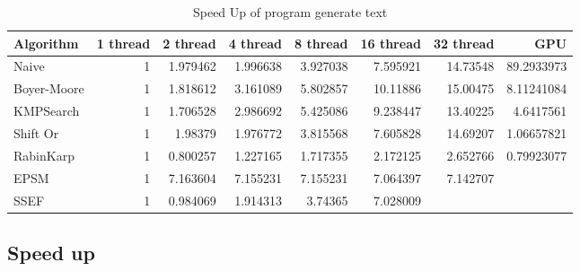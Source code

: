 \documentclass[11pt]{article}       %
\newcommand{\includeFig}[3]      {\begin{figure}[htb] \begin{center}
                                 \includegraphics
                                 [width=4in,keepaspectratio] %
                                 {#2}\caption{\label{#1}#3} \end{center} \end{figure}}
\begin{document}
\begin{table}[htbp]
  \centering
  \caption{Speed Up of program generate text}
    \begin{tabular}{lrrrrrrr}\label{t9}
Algorithm & 1 thread & 2 thread & 4 thread & 8 thread & 16 thread & 32 thread & GPU \\
 \hline
    Naive & 1     & 1.979462 & 1.996638 & 3.927038 & 7.595921 & 14.73548 & 89.2933973 \\
    Boyer-Moore & 1     & 1.818612 & 3.161089 & 5.802857 & 10.11886 & 15.00475 & 8.11241084 \\
    KMPSearch & 1     & 1.706528 & 2.986692 & 5.425086 & 9.238447 & 13.40225 & 4.6417561 \\
    Shift Or & 1     & 1.98379 & 1.976772 & 3.815568 & 7.605828 & 14.69207 & 1.06657821 \\
    RabinKarp & 1     & 0.800257 & 1.227165 & 1.717355 & 2.172125 & 2.652766 & 0.79923077 \\
    EPSM  & 1     & 7.163604 & 7.155231 & 7.155231 & 7.064397 & 7.142707 &  \\
    SSEF  & 1     & 0.984069 & 1.914313 & 3.74365 & 7.028009 &       &  \\

    \end{tabular}%
  \label{tab:addlabel}%
\end{table}%

\subsection{Speed up}\label{su}
\end{document}
